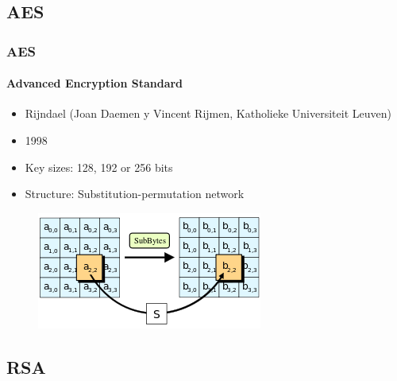 \documentclass{beamer}
\begin{document}
\subsection{AES}

\begin{frame}
\frametitle{AES}
\framesubtitle{Advanced Encryption Standard}
\begin{itemize}
\item Rijndael (Joan Daemen y Vincent Rijmen, Katholieke Universiteit Leuven)
\item 1998
\item Key sizes: 128, 192 or 256 bits
\item Structure: Substitution-permutation network
\end{itemize}
\begin{figure}
\includegraphics[width=0.4\linewidth]{aes.png}
\end{figure}
\end{frame}

\subsection{RSA} %
\end{document}
